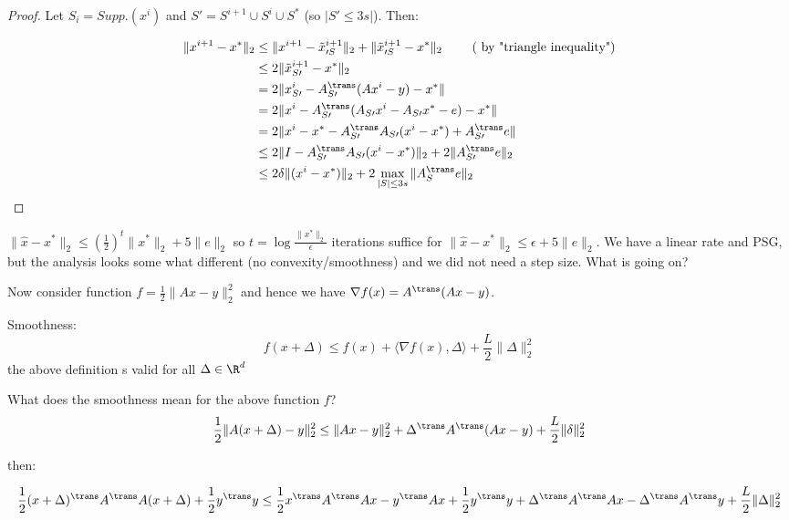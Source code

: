 \begin{proof}
Let $S_i = Supp. (x^i)$ and $ S\prime = S^{i+1} \cup S^i \cup S^*$ (so $|S \prime \leq 3s|$). Then:

\begin{align*}
\|x^{i+1}-x^*\|_2 &\leq \|x^{i+1} - \tilde x_{\prime S}^{i+1}\|_2 + \|\tilde x_{\prime S}^{i+1} -x^*\|_2\  \tag{ by "triangle inequality"}\\
			 &\leq 2 \|\tilde x_{ S\prime}^{i+1} -x^*\|_2\\ 
			 &= 2 \|x_{ S\prime}^i - A_ { S\prime}^{\trans}(Ax^i -y)-x^*\|\\
			 &= 2 \|x^i - A_ {S\prime}^{\trans}(A_ { S \prime}x^i -A_ { S\prime}x^*-e)-x^*\|\\
			 &= 2 \|x^i - x^*- A_ { S\prime}^{\trans}A_ { S\prime} (x^i-x^*) + A_ {S \prime}^{\trans} e\|\\
			 &\leq 2\| I -  A_ {S \prime}^{\trans} A_ {S \prime} (x^i-x^*)\|_2 +   2\| A_ {S \prime}^{\trans} e\|_2 \\
			 &\leq 2 \delta \| (x^i-x^*)\|_2 +   2 \max_{|S| \leq 3s}\| A_ {S}^{\trans} e\|_2
\end{align*}
\end{proof}

\begin{corollary}
$\| \hat x - x^*\|_2 \leq (\frac{1}{2})^t \|x^* \|_2 + 5\|e\|_2$
so $t = \log \frac{\| x^*\|_2}{\epsilon}$ iterations suffice for $\| \hat x - x^*\|_2 \leq \epsilon + 5\|e\|_2$.
 We have a linear rate and PSG, but the analysis looks some what different (no convexity/smoothness) and we did not need a step size. What is going on?
\end{corollary}
Now consider function $f =  \frac{1}{2}\|Ax-y \|_2^2$ and hence we have $\nabla f(x) = A^{\trans}(Ax-y)$.

\begin{definition}
Smoothness:
$$f(x+\Delta) \leq f(x) + \langle \nabla f(x), \Delta \rangle + \frac{L}{2} \| \Delta\|_2^2 $$
the above definition s valid for all $\Delta \in \R^d$  
\end{definition}

What does the smoothness mean for the above function $f$?
$$\frac{1}{2}\|A(x+\Delta) - y\|_2^2 \leq \|Ax-y\|_2^2 + \Delta^{\trans} A^{\trans}(Ax-y) + \frac{L}{2}\|\delta\|_2^2$$

then:

$$\frac{1}{2}(x+\Delta)^{\trans} A^{\trans}A(x+\Delta) + \frac{1}{2}y^{\trans} y \leq \frac{1}{2} x^{\trans} A^{\trans} Ax-y^{\trans} Ax + \frac{1}{2}y^{\trans} y + \Delta^{\trans} A^{\trans} Ax- \Delta^{\trans} A^{\trans} y + \frac{L}{2} \|\Delta\|_2^2 $$

